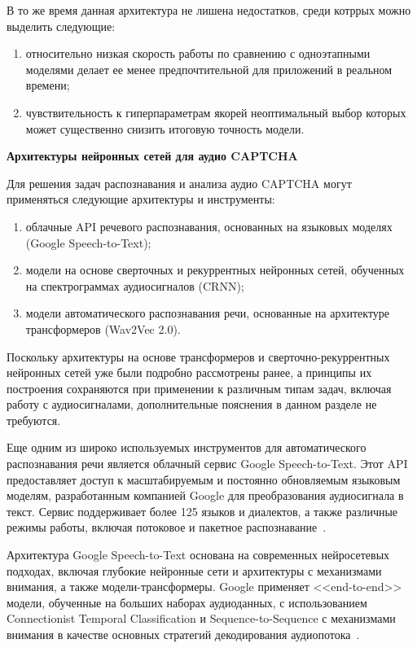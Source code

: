 В то же время данная архитектура не лишена недостатков, среди котррых можно 
выделить следующие:

\begin{enumerate}
    \item относительно низкая скорость работы по сравнению с одноэтапными 
    моделями делает ее менее предпочтительной для приложений в реальном времени;
    \item чувствительность к гиперпараметрам якорей неоптимальный выбор которых 
    может существенно снизить итоговую точность модели.
\end{enumerate}

\textbf{Архитектуры нейронных сетей для аудио CAPTCHA}

Для решения задач распознавания и анализа аудио CAPTCHA могут применяться 
следующие архитектуры и инструменты:

\begin{enumerate}
    \item облачные API речевого распознавания, основанных на языковых моделях 
    (Google Speech-to-Text);
    \item модели на основе сверточных и рекуррентных нейронных сетей, обученных 
    на спектрограммах аудиосигналов (CRNN);
    \item модели автоматического распознавания речи, основанные на архитектуре 
    трансформеров (Wav2Vec 2.0).
\end{enumerate}

Поскольку архитектуры на основе трансформеров и сверточно-рекуррентных нейронных 
сетей уже были подробно рассмотрены ранее, а принципы их построения сохраняются 
при применении к различным типам задач, включая работу с аудиосигналами, 
дополнительные пояснения в данном разделе не требуются.

Еще одним из широко используемых инструментов для автоматического распознавания 
речи является облачный сервис Google Speech-to-Text. Этот API предоставляет 
доступ к масштабируемым и постоянно обновляемым языковым моделям, разработанным 
компанией Google для преобразования аудиосигнала в текст. Сервис поддерживает 
более 125 языков и диалектов, а также различные режимы работы, включая потоковое 
и пакетное распознавание~\cite{googlesppechtotext}.

Архитектура Google Speech-to-Text основана на современных нейросетевых подходах, 
включая глубокие нейронные сети и архитектуры с механизмами внимания, а также 
модели-трансформеры. Google применяет <<end-to-end>> модели, обученные на больших 
наборах аудиоданных, с использованием Connectionist Temporal Classification и 
Sequence-to-Sequence с механизмами внимания в качестве основных стратегий 
декодирования аудиопотока~\cite{archecturespeechtotext}.

